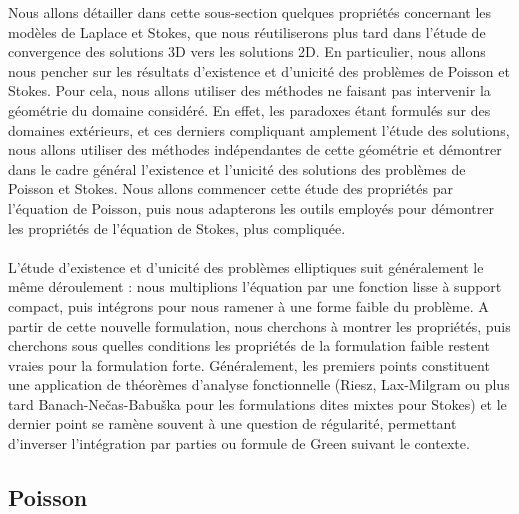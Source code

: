 Nous allons détailler dans cette sous-section quelques propriétés concernant les modèles de Laplace et Stokes, que nous réutiliserons plus tard dans l'étude de convergence des solutions 3D vers les solutions 2D. En particulier, nous allons nous pencher sur les résultats d'existence et d'unicité des problèmes de Poisson et Stokes. Pour cela, nous allons 
utiliser des méthodes ne faisant pas intervenir la géométrie du domaine considéré. En effet, les paradoxes étant formulés sur des domaines extérieurs, et ces derniers compliquant amplement l'étude des solutions, nous allons utiliser des méthodes indépendantes de cette géométrie et démontrer 
dans le cadre général l'existence et l'unicité des solutions des problèmes de Poisson et Stokes. 
Nous allons commencer cette étude des propriétés par l'équation de Poisson, puis nous adapterons les outils employés pour démontrer les propriétés de l'équation de Stokes, plus compliquée.
\\
\\
L'étude d'existence et d'unicité des problèmes elliptiques suit généralement le même déroulement : nous multiplions l'équation par une fonction lisse à support compact, puis intégrons pour nous ramener à une forme faible du problème. A partir de cette nouvelle formulation, 
nous cherchons à montrer les propriétés, puis cherchons sous quelles conditions les propriétés de la formulation faible restent vraies pour la formulation forte. Généralement, les premiers points constituent une application de théorèmes d'analyse fonctionnelle (Riesz, Lax-Milgram ou plus tard Banach-Ne\v{c}as-Babu\v{s}ka pour les formulations dites mixtes pour Stokes) et le dernier point se ramène souvent à une question de régularité, permettant 
d'inverser l'intégration par parties ou formule de Green suivant le contexte. \\



\subsection{Poisson}

